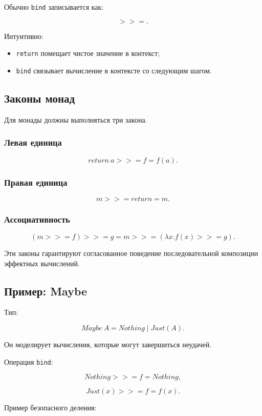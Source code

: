 \documentclass[12pt,a4paper]{article}
\begin{document}
Обычно \texttt{bind} записывается как:

\[
>>=.
\]

Интуитивно:
\begin{itemize}
  \item \texttt{return} помещает чистое значение в контекст;
  \item \texttt{bind} связывает вычисление в контексте со следующим шагом.
\end{itemize}

\subsection{Законы монад}

Для монады должны выполняться три закона.

\subsubsection{Левая единица}

\[
return\ a >>= f = f(a).
\]

\subsubsection{Правая единица}

\[
m >>= return = m.
\]

\subsubsection{Ассоциативность}

\[
(m >>= f) >>= g
=
m >>= (\lambda x. f(x) >>= g).
\]

Эти законы гарантируют согласованное поведение последовательной композиции эффектных вычислений.

\subsection{Пример: Maybe}

Тип:

\[
Maybe\ A = Nothing \mid Just(A).
\]

Он моделирует вычисления, которые могут завершиться неудачей.

Операция \texttt{bind}:

\[
Nothing >>= f = Nothing,
\]

\[
Just(x) >>= f = f(x).
\]

Пример безопасного деления:
\end{document}

